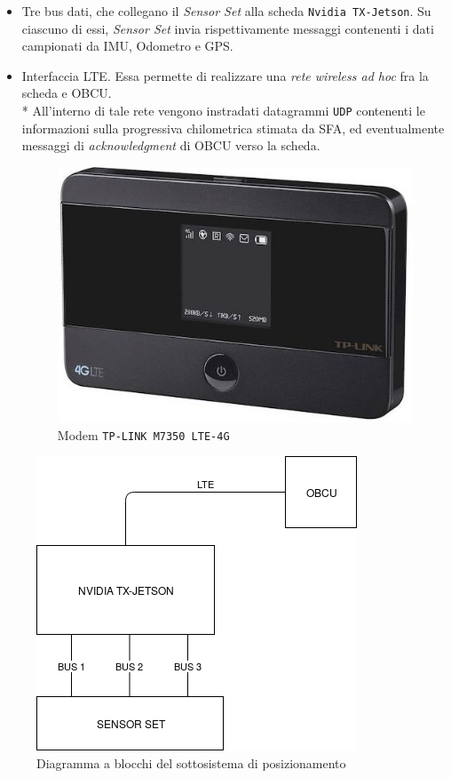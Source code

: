 	\begin{itemize}
		\item Tre bus dati, che collegano il \emph{Sensor Set} alla scheda \texttt{Nvidia TX-Jetson}. Su ciascuno di essi, \emph{Sensor Set} invia rispettivamente messaggi contenenti i dati campionati da IMU, Odometro e GPS.
		\item Interfaccia LTE. Essa permette di realizzare una \emph{rete wireless ad hoc} fra la scheda e OBCU.\\*
		All'interno di tale rete vengono instradati datagrammi \texttt{UDP} contenenti le informazioni sulla progressiva chilometrica stimata da SFA, ed eventualmente messaggi di \emph{acknowledgment} di OBCU verso la scheda.
		\begin{figure}[h]
			\centering
			\includegraphics[scale=0.40]{img/lte}
			\caption{Modem \texttt{TP-LINK M7350 LTE-4G}}
			\label{fig:lte}
		\end{figure}
	\end{itemize}
	\begin{figure}[h]
		\centering
		\includegraphics[scale=0.6]{img/TrainDiagram}
		\caption{Diagramma a blocchi del sottosistema di posizionamento}
		\label{fig:tdiagram}
	\end{figure}
